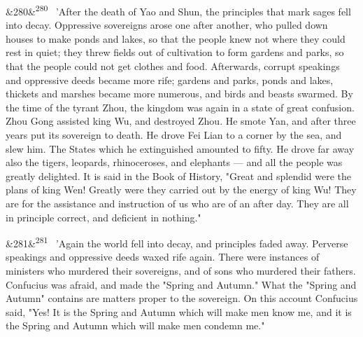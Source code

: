 \documentclass[12pt]{article}
\newcommand{\para}[1][]{\par\noindent\ifx&#1&\else\textsuperscript{\footnotesize #1}~\fi}
\begin{document}
\para[280] 'After the death of Yao and Shun, the principles that mark sages fell into decay. Oppressive sovereigns arose one after another, who pulled down houses to make ponds and lakes, so that the people knew not where they could rest in quiet; they threw fields out of cultivation to form gardens and parks, so that the people could not get clothes and food. Afterwards, corrupt speakings and oppressive deeds became more rife; gardens and parks, ponds and lakes, thickets and marshes became more numerous, and birds and beasts swarmed. By the time of the tyrant Zhou, the kingdom was again in a state of great confusion. Zhou Gong assisted king Wu, and destroyed Zhou. He smote Yan, and after three years put its sovereign to death. He drove Fei Lian to a corner by the sea, and slew him. The States which he extinguished amounted to fifty. He drove far away also the tigers, leopards, rhinoceroses, and elephants --- and all the people was greatly delighted. It is said in the Book of History, "Great and splendid were the plans of king Wen! Greatly were they carried out by the energy of king Wu! They are for the assistance and instruction of us who are of an after day. They are all in principle correct, and deficient in nothing."

\para[281] 'Again the world fell into decay, and principles faded away. Perverse speakings and oppressive deeds waxed rife again. There were instances of ministers who murdered their sovereigns, and of sons who murdered their fathers. Confucius was afraid, and made the "Spring and Autumn." What the "Spring and Autumn" contains are matters proper to the sovereign. On this account Confucius said, "Yes! It is the Spring and Autumn which will make men know me, and it is the Spring and Autumn which will make men condemn me."
\end{document}
